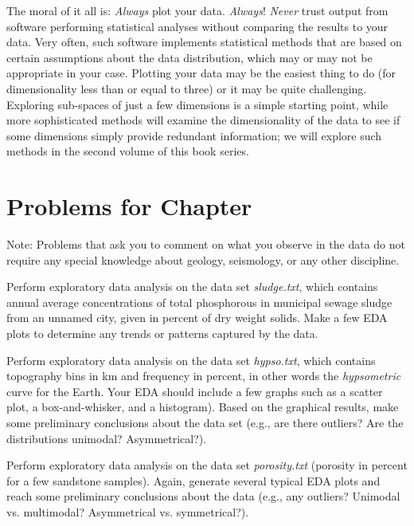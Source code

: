 The moral of it all is:  \emph{Always} plot your data.  \emph{Always}! \emph{Never} trust output from software performing statistical 
analyses without comparing the results to your data.  Very often, such software implements statistical
methods that are based on certain
assumptions about the data distribution, which may or may not be appropriate in your case.  Plotting your
data may be the easiest thing to do (for dimensionality less than or equal to three) or it may be quite
challenging.  Exploring sub-spaces of just a few dimensions is a simple starting point, while more
sophisticated methods will examine the dimensionality of the data to see if some dimensions simply
provide redundant information; we will explore such methods in the second volume of this book series.

\clearpage
\section{Problems for Chapter \thechapter}
Note: Problems that ask you to comment on what you observe in the data do not require any special knowledge
about geology, seismology, or any other discipline.

\begin{problem}
Perform exploratory data analysis on the data set \emph{sludge.txt}, which contains annual average concentrations
of total phosphorous in municipal sewage sludge from an unnamed city, given in percent of dry weight solids.
Make a few EDA plots to determine any trends or patterns captured by the data.
\end{problem}

\begin{problem}
Perform exploratory data analysis on the data set \emph{hypso.txt}, which contains topography bins in km and frequency in percent,
in other words the \emph{hypsometric} curve for the Earth.  Your EDA should include a few graphs such as a scatter plot, a box-and-whisker,
and a histogram).  Based on the graphical results, make some
preliminary conclusions about the data set (e.g., are there outliers? Are the distributions unimodal? Asymmetrical?).
\end{problem}

\begin{problem}
Perform exploratory data analysis on the data set \emph{porosity.txt} (porosity in percent for a few
sandstone samples).  Again, generate several typical EDA plots and reach some
preliminary conclusions about the data (e.g., any outliers? Unimodal vs. multimodal? Asymmetrical vs. symmetrical?).
\end{problem}

